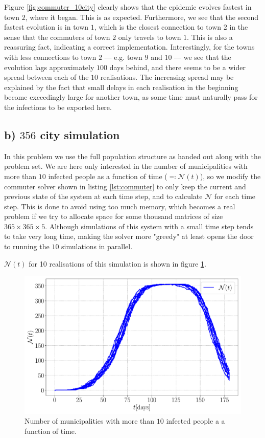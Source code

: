 Figure \ref{fig:commuter_10city} clearly shows that the epidemic evolves fastest in town $2$, where it began. This is as expected. Furthermore, we see that the second fastest evolution is in town $1$, which is the closest connection to town $2$ in the sense that the commuters of town $2$ only travels to town $1$. This is also a reassuring fact, indicating a correct implementation. Interestingly, for the towns with less connections to town $2$ --- e.g. town $9$ and $10$ --- we see that the evolution lags approximately $100$ days behind, and there seems to be a wider spread between each of the $10$ realisations. The increasing spread may be explained by the fact that small delays in each realisation in the beginning become exceedingly large for another town, as some time must naturally pass for the infections to be exported here.

\subsection{b) $356$ city simulation}

In this problem we use the full population structure as handed out along with the problem set. We are here only interested in the number of municipalities with more than $10$ infected people as a function of time ($\eqqcolon \mathcal{N}(t)$), so we modify the commuter solver shown in listing \ref{lst:commuter} to only keep the current and previous state of the system at each time step, and to calculate $\mathcal{N}$ for each time step. This is done to avoid using too much memory, which becomes a real problem if we try to allocate space for some thousand matrices of size $365 \times 365 \times 5$. Although simulations of this system with a small time step tends to take very long time, making the solver more "greedy" at least opens the door to running the $10$ simulations in parallel. 

$\mathcal{N}(t)$ for 10 realisations of this simulation is shown in figure \ref{fig:infected_Eb}.  

\begin{figure}[htb]
	\centering
	\includegraphics[width=0.9\columnwidth]{../fig/2Eb_N.pdf}
	\caption{Number of municipalities with more than $10$ infected people a a function of time.}
	\label{fig:infected_Eb}
\end{figure}

